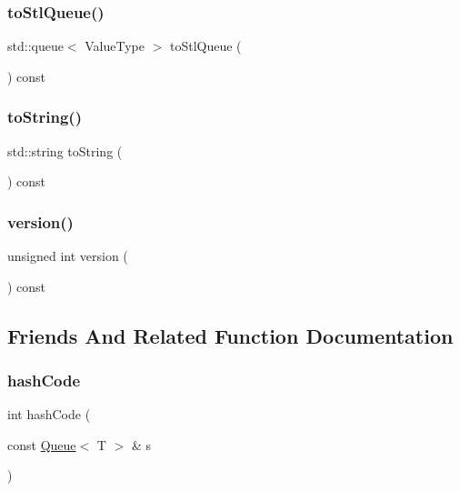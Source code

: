 \subsubsection{\texorpdfstring{to\+Stl\+Queue()}{toStlQueue()}}
{\footnotesize\ttfamily std\+::queue$<$ Value\+Type $>$ to\+Stl\+Queue (\begin{DoxyParamCaption}{ }\end{DoxyParamCaption}) const}

\mbox{\label{classQueue_a1fe5121d6528fdea3f243321b3fa3a49}} 
\subsubsection{\texorpdfstring{to\+String()}{toString()}}
{\footnotesize\ttfamily std\+::string to\+String (\begin{DoxyParamCaption}{ }\end{DoxyParamCaption}) const}

\mbox{\label{classQueue_a0aa696ccb72cbf928535d6b646bac1aa}} 
\subsubsection{\texorpdfstring{version()}{version()}}
{\footnotesize\ttfamily unsigned int version (\begin{DoxyParamCaption}{ }\end{DoxyParamCaption}) const}



\subsection{Friends And Related Function Documentation}
\mbox{\label{classQueue_aacd62c6f29c1e575d1290a1088dd29e1}} 
\subsubsection{\texorpdfstring{hash\+Code}{hashCode}}
{\footnotesize\ttfamily int hash\+Code (\begin{DoxyParamCaption}\item[{const \mbox{\hyperlink{classQueue}{Queue}}$<$ T $>$ \&}]{s }\end{DoxyParamCaption})\hspace{0.3cm}{\ttfamily [friend]}}

